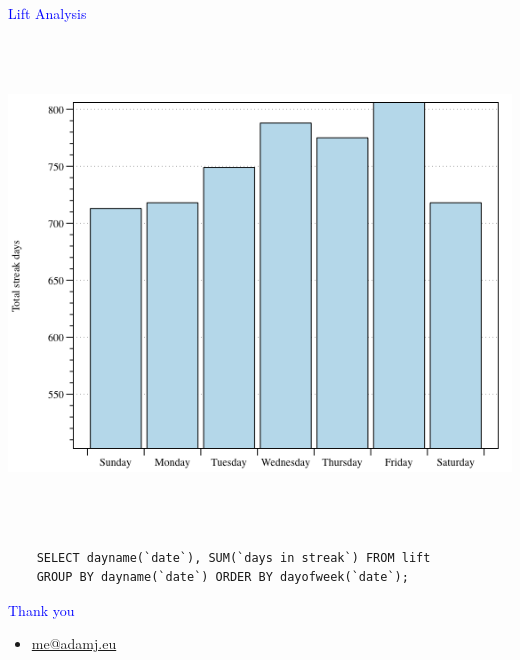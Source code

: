 \documentclass[landscape]{slides}
\begin{document}
\begin{slide}

    \textcolor{blue}{\Large{Lift Analysis}}

    \begin{center}
        \includegraphics[height=13cm]{lift-group-day}
    \end{center}

    \begin{small}
        \begin{verbatim}
    SELECT dayname(`date`), SUM(`days in streak`) FROM lift
    GROUP BY dayname(`date`) ORDER BY dayofweek(`date`);
        \end{verbatim}
    \end{small}

\end{slide}


\begin{slide}
    \textcolor{blue}{\Large{Thank you}}

    \begin{itemize}
        \item \url{me@adamj.eu}
    \end{itemize}

\end{slide}
\end{document}
